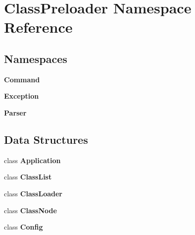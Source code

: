 \section{Class\+Preloader Namespace Reference}
\label{namespace_class_preloader}
\subsection*{Namespaces}
\begin{DoxyCompactItemize}
\item 
 {\bf Command}
\item 
 {\bf Exception}
\item 
 {\bf Parser}
\end{DoxyCompactItemize}
\subsection*{Data Structures}
\begin{DoxyCompactItemize}
\item 
class {\bf Application}
\item 
class {\bf Class\+List}
\item 
class {\bf Class\+Loader}
\item 
class {\bf Class\+Node}
\item 
class {\bf Config}
\end{DoxyCompactItemize}
